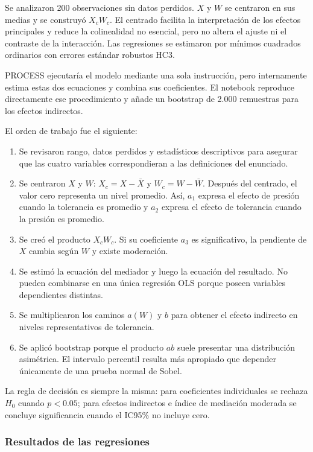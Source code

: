 \documentclass[11pt,letterpaper]{article}
\begin{document}
Se analizaron 200 observaciones sin datos perdidos. $X$ y $W$ se centraron en sus medias y se construyó $X_cW_c$. El centrado facilita la interpretación de los efectos principales y reduce la colinealidad no esencial, pero no altera el ajuste ni el contraste de la interacción. Las regresiones se estimaron por mínimos cuadrados ordinarios con errores estándar robustos HC3.

PROCESS ejecutaría el modelo mediante una sola instrucción, pero internamente estima estas dos ecuaciones y combina sus coeficientes. El notebook reproduce directamente ese procedimiento y añade un bootstrap de 2.000 remuestras para los efectos indirectos.

El orden de trabajo fue el siguiente:

\begin{enumerate}
\item Se revisaron rango, datos perdidos y estadísticos descriptivos para asegurar que las cuatro variables correspondieran a las definiciones del enunciado.
\item Se centraron $X$ y $W$: $X_c=X-\bar X$ y $W_c=W-\bar W$. Después del centrado, el valor cero representa un nivel promedio. Así, $a_1$ expresa el efecto de presión cuando la tolerancia es promedio y $a_2$ expresa el efecto de tolerancia cuando la presión es promedio.
\item Se creó el producto $X_cW_c$. Si su coeficiente $a_3$ es significativo, la pendiente de $X$ cambia según $W$ y existe moderación.
\item Se estimó la ecuación del mediador y luego la ecuación del resultado. No pueden combinarse en una única regresión OLS porque poseen variables dependientes distintas.
\item Se multiplicaron los caminos $a(W)$ y $b$ para obtener el efecto indirecto en niveles representativos de tolerancia.
\item Se aplicó bootstrap porque el producto $ab$ suele presentar una distribución asimétrica. El intervalo percentil resulta más apropiado que depender únicamente de una prueba normal de Sobel.
\end{enumerate}

La regla de decisión es siempre la misma: para coeficientes individuales se rechaza $H_0$ cuando $p<0.05$; para efectos indirectos e índice de mediación moderada se concluye significancia cuando el IC95\% no incluye cero.

\subsubsection*{Resultados de las regresiones}
\end{document}
